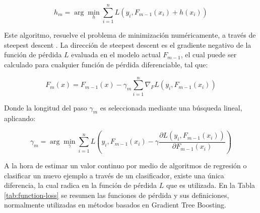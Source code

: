\begin{equation}
	h_m =  \arg\min_{h} \sum_{i=1}^{n} L(y_i, F_{m-1}(x_i) + h(x_i))
\end{equation}

Este algoritmo, resuelve el problema de minimización numéricamente, a través de steepest descent \cite{battiti1992first}. La dirección de steepest descent es el gradiente negativo de la función de pérdida $L$ evaluada en el modelo actual $F_{m-1}$, el cual puede ser calculado para cualquier función de pérdida diferenciable, tal que:

\begin{equation}
	F_m(x) = F_{m-1}(x) - \gamma_m \sum_{i=1}^{n} \nabla_F L(y_i, F_{m-1}(x_i))
\end{equation}

Donde la longitud del paso $\gamma_{m}$ es seleccionada mediante una búsqueda lineal, aplicando:

\begin{equation}
	\gamma_m = \arg\min_{\gamma} \sum_{i=1}^{n} L(y_i, F_{m-1}(x_i) - \gamma \frac{\partial L(y_i, F_{m-1}(x_i))}{\partial F_{m-1}(x_i)})
\end{equation}

A la hora de estimar un valor continuo por medio de algoritmos de regresión o clasificar un nuevo ejemplo a través de un clasificador, existe una única diferencia, la cual radica en la función de pérdida $L$ que es utilizada. En la Tabla \ref{tab:function-loss} se resumen las funciones de pérdida y sus definiciones, normalmente utilizadas en métodos basados en Gradient Tree Boosting.

